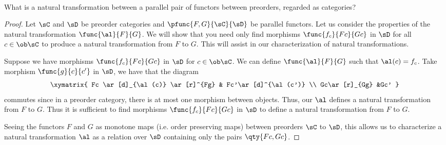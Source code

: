 \documentclass[../../main]{subfiles}
\begin{document}
\paragraph{}
\begin{exercise}
	What is a natural transformation between a parallel pair of functors between
	preorders, regarded as categories?
\end{exercise}

\begin{proof}
	Let $\sC$ and $\sD$ be preorder categories and $\pfunc{F,G}{\sC}{\sD}$ be
	parallel functors. Let us consider the properties of the natural
	transformation $\func{\al}{F}{G}$. We will show that you need only find
	morphisms $\func{f_{c}}{Fc}{Gc}$ in $\sD$ for all $c \in \ob \sC$ to produce
	a natural transformation from $F$ to $G$. This will assist in our
	characterization of natural transformations.

	Suppose we have morphisms $\func{f_{c}}{Fc}{Gc}$ in $\sD$ for $c \in \ob
	\sC$.  We can define $\func{\al}{F}{G}$ such that $\al(c) = f_{c}$. Take
	morphism $\func{g}{c}{c'}$ in $\sD$, we have that the diagram
	\[\xymatrix{ Fc \ar[d]_{\al(c)} \ar[r]^{Fg} & Fc'\ar[d]^{\al(c')}  \\
	Gc\ar[r]_{Gg} &Gc'   }\]
	commutes since in a preorder category, there is at most one
	morphism between objects. Thus, our $\al$ defines a natural
	transformation from $F$ to $G$. Thus it is sufficient to find morphisms
	$\func{f_{c}}{Fc}{Gc}$ in $\sD$ to define a natural transformation from
	$F$ to $G$.

	Seeing the functors $F$ and $G$ as monotone maps (i.e. order preserving
	maps) between preorders $\sC$ to $\sD$, this allows us to characterize a
	natural transformation $\al$ as a relation over $\sD$ containing only the
	pairs $\qty{Fc,Gc}$.
\end{proof}
\end{document}
